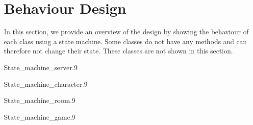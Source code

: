 \section{Behaviour Design}
\label{sec:behaviourdesign}
In this section, we provide an overview of the design by showing the behaviour of each class using a state machine. Some classes do not have any methods and can therefore not change their state. These classes are not shown in this section.

\begin{myfigure}{State_machine_server}{.9}%
	\caption{State machine for the server class}
	\label{fig:state-machine-server}
\end{myfigure}

\begin{myfigure}{State_machine_character}{.9}%
	\caption{State machine for the character class}
	\label{fig:state-machine-server}
\end{myfigure}

\begin{myfigure}{State_machine_room}{.9}%
	\caption{State machine for the room class}
	\label{fig:state-machine-server}
\end{myfigure}

\begin{myfigure}{State_machine_game}{.9}%
	\caption{State machine for the game class}
	\label{fig:state-machine-server}
\end{myfigure}


